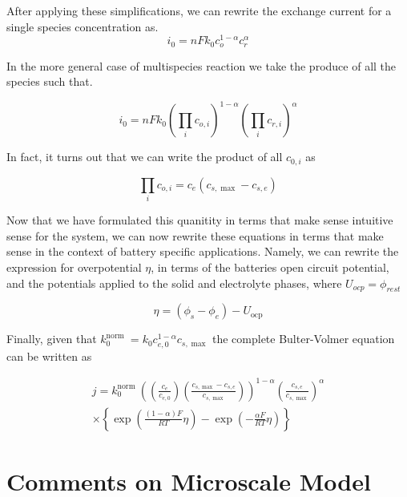 \documentclass[lettersize,journal]{IEEEtran}
\begin{document}
\noindent After applying these simplifications, we can rewrite the exchange current for a single species concentration as.
\begin{equation}
i_{0}=n F k_{0} c_{o}^{1-\alpha} c_{r}^{\alpha}
\end{equation}

\noindent In the more general case of multispecies reaction we take the produce of all the species such that.

\begin{equation}
i_{0}=n F k_{0}\left(\prod_{i} c_{o, i}\right)^{1-\alpha}\left(\prod_{i} c_{r, i}\right)^{\alpha}
\end{equation}

\noindent In fact, it turns out that we can write the product of all $c_{0,i}$ as

\begin{equation}
\prod_{i} c_{o, i}=c_{e}\left(c_{s, \max }-c_{s, e}\right)
\end{equation}

\noindent Now that we have formulated this quanitity in terms that make sense intuitive sense for the system, we can now rewrite these equations in terms that make sense in the context of battery specific applications. Namely, we can rewrite the expression for overpotential $\eta$, in terms of the batteries open circuit potential, and the potentials applied to the solid and electrolyte phases, where $U_{ocp} = \phi_{rest}$

\begin{equation}
\eta=\left(\phi_{s}-\phi_{e}\right)-U_{\mathrm{ocp}}
\end{equation}

Finally, given that $k_{0}^{\text {norm }} = {k_{0} c_{e, 0}^{1-\alpha} c_{s, \max }}$ the complete Bulter-Volmer equation can be written as

\begin{equation}
\begin{array}{c}
j=k_{0}^{\text {norm }}\left(\left(\frac{c_{e}}{c_{e, 0}}\right)\left(\frac{c_{s, \max }-c_{s, e}}{c_{s, \max }}\right)\right)^{1-\alpha}\left(\frac{c_{s, e}}{c_{s, \max }}\right)^{\alpha} \\
\times\left\{\exp \left(\frac{(1-\alpha) F}{R T} \eta\right)-\exp \left(-\frac{\alpha F}{R T} \eta\right)\right\}
\end{array}
\end{equation}

\section{Comments on Microscale Model}
\end{document}
